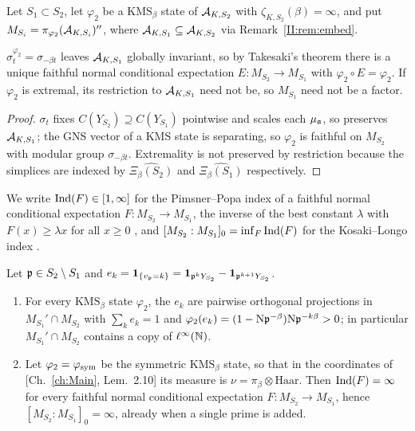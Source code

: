 Let $S_1\subset S_2$, let $\varphi_2$ be a $\mathrm{KMS}_\beta$ state of $\mathcal{A}_{K,S_2}$ with
$\zeta_{K,S_2}(\beta)=\infty$, and put $M_{S_i}=\pi_{\varphi_2}(\mathcal{A}_{K,S_i})''$, where
$\mathcal{A}_{K,S_1}\subseteq\mathcal{A}_{K,S_2}$ via Remark~\ref{II:rem:embed}.

\begin{proposition}\label{II:prop:E}
$\sigma^{\varphi_2}_t=\sigma_{-\beta t}$ leaves $\mathcal{A}_{K,S_1}$ globally invariant, so by
Takesaki's theorem \cite{Takesaki} there is a unique faithful normal conditional expectation
$E:M_{S_2}\to M_{S_1}$ with $\varphi_2\circ E=\varphi_2$. If $\varphi_2$ is extremal, its
restriction to $\mathcal{A}_{K,S_1}$ need not be, so $M_{S_1}$ need not be a factor.
\end{proposition}

\begin{proof}
$\sigma_t$ fixes $C(Y_{S_2})\supseteq C(Y_{S_1})$ pointwise and scales each $\mu_{\mathfrak{a}}$, so
preserves $\mathcal{A}_{K,S_1}$; the GNS vector of a KMS state is separating, so $\varphi_2$ is
faithful on $M_{S_2}$ with modular group $\sigma_{-\beta t}$. Extremality is not preserved by
restriction because the simplices are indexed by $\widehat{\Xi_\beta(S_2)}$ and
$\widehat{\Xi_\beta(S_1)}$ respectively.
\end{proof}

We write $\operatorname{Ind}(F)\in[1,\infty]$ for the Pimsner--Popa index of a faithful normal conditional
expectation $F:M_{S_2}\to M_{S_1}$, the inverse of the best constant $\lambda$ with
$F(x)\ge\lambda x$ for all $x\ge0$ \cite{PP}, and $[M_{S_2}:M_{S_1}]_0=\inf_F\operatorname{Ind}(F)$ for
the Kosaki--Longo index \cite{Kosaki,Longo}.

\begin{theorem}\label{II:thm:infinite}
Let $\mathfrak{p}\in S_2\setminus S_1$ and $e_k=\mathbf 1_{\{v_{\mathfrak{p}}=k\}}=\mathbf 1_{\mathfrak{p}^kY_{S_2}}-\mathbf 1_{\mathfrak{p}^{k+1}Y_{S_2}}$.
\begin{enumerate}
\item For every $\mathrm{KMS}_\beta$ state $\varphi_2$, the $e_k$ are pairwise orthogonal
projections in $M_{S_1}'\cap M_{S_2}$ with $\sum_ke_k=1$ and
$\varphi_2(e_k)=(1-\mathrm{N}\mathfrak{p}^{-\beta})\mathrm{N}\mathfrak{p}^{-k\beta}>0$; in particular $M_{S_1}'\cap M_{S_2}$
contains a copy of $\ell^\infty(\mathbb{N})$.
\item Let $\varphi_2=\varphi_{\mathrm{sym}}$ be the symmetric $\mathrm{KMS}_\beta$ state, so that in the
coordinates of [Ch.~\ref{ch:Main}, Lem.~2.10] its measure is $\nu=\pi_\beta\otimes\mathrm{Haar}$.
Then $\operatorname{Ind}(F)=\infty$ for every faithful normal conditional expectation
$F:M_{S_2}\to M_{S_1}$, hence $[M_{S_2}:M_{S_1}]_0=\infty$, already when a single prime is
added.
\end{enumerate}
\end{theorem}

